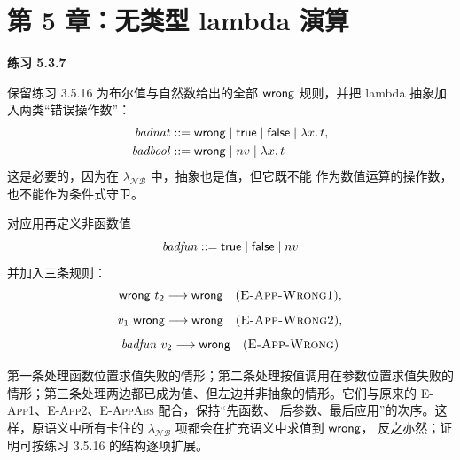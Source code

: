 \section*{第 5 章：无类型 lambda 演算}

\begin{taplsolutionentrybox}
\label{sol:translator:5.3.7}
\textbf{练习 5.3.7}

保留练习 3.5.16 为布尔值与自然数给出的全部
\(\mathsf{wrong}\) 规则，并把 lambda 抽象加入两类“错误操作数”：
\[
\begin{aligned}
\mathit{badnat}&::=\mathsf{wrong}\mid\mathsf{true}\mid\mathsf{false}
                  \mid\lambda x.\,t,\\
\mathit{badbool}&::=\mathsf{wrong}\mid nv\mid\lambda x.\,t
\end{aligned}
\]
这是必要的，因为在 \(\lambda_{\mathcal{NB}}\) 中，抽象也是值，但它既不能
作为数值运算的操作数，也不能作为条件式守卫。

对应用再定义非函数值
\[
  \mathit{badfun}::=\mathsf{true}\mid\mathsf{false}\mid nv
\]
并加入三条规则：
\[
  \taplwrong\ t_2\trans\taplwrong
  \quad(\textsc{E-App-Wrong1}),
\]
\[
  v_1\ \mathsf{wrong}\mathrel{\longrightarrow}\mathsf{wrong}
  \quad(\textsc{E-App-Wrong2}),
\]
\[
  \mathit{badfun}\ v_2\mathrel{\longrightarrow}\mathsf{wrong}
  \quad(\textsc{E-App-Wrong})
\]

第一条处理函数位置求值失败的情形；第二条处理按值调用在参数位置求值失败的
情形；第三条处理两边都已成为值、但左边并非抽象的情形。它们与原来的
\textsc{E-App1}、\textsc{E-App2}、\textsc{E-AppAbs} 配合，保持“先函数、
后参数、最后应用”的次序。这样，原语义中所有卡住的
\(\lambda_{\mathcal{NB}}\) 项都会在扩充语义中求值到 \(\mathsf{wrong}\)，
反之亦然；证明可按练习 3.5.16 的结构逐项扩展。

\end{taplsolutionentrybox}
